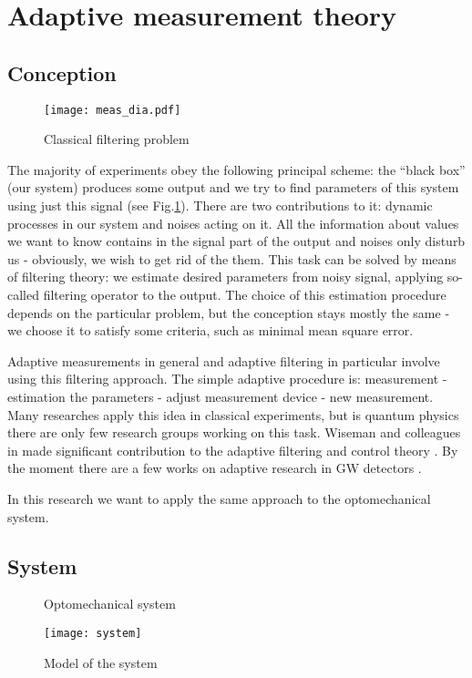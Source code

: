 \section{Adaptive measurement theory}\label{sec:th}
\subsection{Conception}
\begin{figure}
\vspace{-5ex}

\texttt{[image: meas\_dia.pdf]}
\caption{Classical filtering problem}
\label{pic:stfilt}
\end{figure}

The majority of experiments obey the following principal scheme: the ``black box'' (our system) produces some output and we try to find parameters of this system using just this signal (see Fig.\ref{pic:stfilt}). There are two contributions to it: dynamic processes in our system and noises acting on it. 
All the information about values we want to know contains in the signal part of the output and noises only disturb us - obviously, we wish to get rid
of the them. This task can be solved by means of filtering theory: we estimate desired parameters from noisy signal, applying so-called filtering 
operator to the output. The choice of this estimation procedure depends on the particular problem, but the conception stays mostly the same - we choose
it to satisfy some criteria, such as minimal mean square error.

Adaptive measurements in general and adaptive filtering in particular involve using this filtering approach\cite{Wiseman2011a,Ahn2008}. The simple adaptive procedure is:
measurement - estimation the parameters - adjust measurement device - new measurement. Many researches apply this idea in classical experiments, but 
is quantum physics there are only few research groups working on this task\cite{Wiseman1997,Braginsky1993}. Wiseman and colleagues in made significant contribution to the adaptive filtering and
control theory \cite{Berry2008,Berry2001,Berry2002,Measurements1995m}. By the moment there are a few works on adaptive research in GW detectors \cite{Hentschel2010,Dhurandhar2008}.

In this research we want to apply the same approach to the optomechanical system.
\subsection{System}
\begin{figure}
\begin{minipage}[b]{0.6\linewidth}
\caption{Optomechanical system}
\label{pic:scheme}
\end{minipage}
\hspace{0.05\linewidth}
\begin{minipage}[b]{0.3\linewidth}
 \texttt{[image: system]}
 \caption{Model of the system}
 \label{pic:sys}
\end{minipage}
\end{figure}

